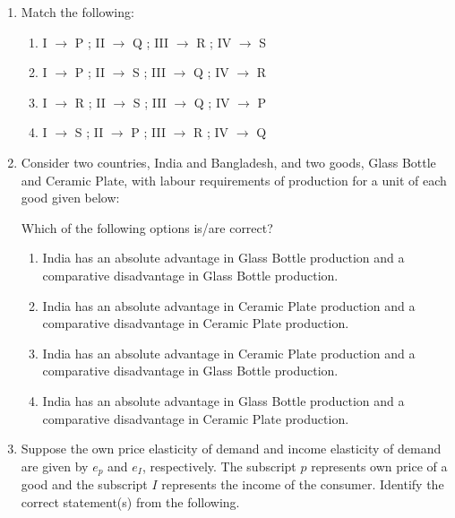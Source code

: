 \documentclass[12pt]{article}
\theoremstyle{remark}
\begin{document}
\begin{enumerate}
\begin{enumerate}
\begin{multicols}{2}
\end{multicols} \end{enumerate}
\hfill{}
\item 
Match the following: 
\vspace{0.2cm}
\begin{table}[H]

\end{table}

\begin{enumerate} 
\item   I $\rightarrow$ P ; II $\rightarrow$ Q ; III $\rightarrow$ R ; IV $\rightarrow$ S 
\item   I $\rightarrow$ P ; II $\rightarrow$ S ; III $\rightarrow$ Q ; IV $\rightarrow$ R 
\item   I $\rightarrow$ R ; II $\rightarrow$ S ; III $\rightarrow$ Q ; IV $\rightarrow$ P 
\item   I $\rightarrow$ S ; II $\rightarrow$ P ; III $\rightarrow$ R ; IV $\rightarrow$ Q 
\end{enumerate}
\hfill{}
\item Consider two countries, India and Bangladesh, and two goods, Glass Bottle and Ceramic Plate, with labour requirements of production for a unit of each good given below:
\begin{table}[H]

\end{table}
Which of the following options is/are correct? \\
\begin{enumerate}
\item   India has an absolute advantage in Glass Bottle production and a comparative disadvantage in Glass Bottle production. 
\item   India has an absolute advantage in Ceramic Plate production and a comparative disadvantage in Ceramic Plate production.
\item   India has an absolute advantage in Ceramic Plate production and a comparative disadvantage in Glass Bottle production. 
\item   India has an absolute advantage in Glass Bottle production and a comparative disadvantage in Ceramic Plate production.
\end{enumerate}
\hfill{}
\item Suppose the own price elasticity of demand and income elasticity of demand are given by $e_p$ and $e_I$, respectively. The subscript $p$ represents own price of a good and the subscript $I$ represents the income of the consumer. Identify the correct statement(s) from the following. 

\end{enumerate}
\end{document}

